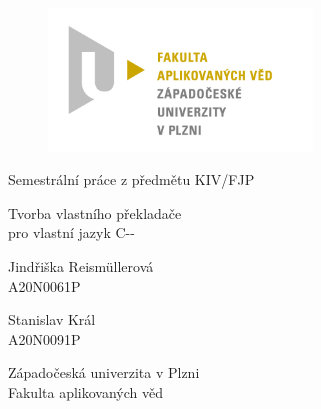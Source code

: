\documentclass[12pt, a4paper]{article}
\begin{document}
	\renewcommand{\lstlistingname}{Ukázka kódu}
	\renewcommand{\lstlistlistingname}{Seznam ukázek kódu}
    \begin{titlepage}

        \centering

        \vspace*{\baselineskip}
        \begin{figure}[H]
        \centering
        \includegraphics[width=7cm]{img/fav-logo.jpg}
        \end{figure}

        \vspace*{1\baselineskip}

        \vspace{0.75\baselineskip}

        \vspace{0.5\baselineskip}
        {Semestrální práce z předmětu KIV/FJP}

        {\LARGE\sc Tvorba vlastního překladače\\}
        {\sc pro vlastní jazyk C-{}-\\}

        \vspace{4\baselineskip}

        \vspace{0.5\baselineskip}

        {\sc\Large Jindřiška Reismüllerová \\}
        \vspace{0.5\baselineskip}
        {A20N0061P}

        {\sc\Large Stanislav Král \\}
        \vspace{0.5\baselineskip}
        {A20N0091P}

        \vfill

        {\sc Západočeská univerzita v Plzni\\
        Fakulta aplikovaných věd}

    \end{titlepage}
\end{document}
